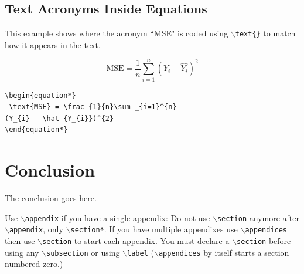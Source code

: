 \documentclass[lettersize,journal]{IEEEtran}
\begin{document}
\subsection{ Text Acronyms Inside Equations}
This example shows where the acronym ``MSE" is coded using $\backslash${\tt{text\{\}}} to match how it appears in the text.

\begin{equation*}
 \text{MSE} = \frac {1}{n}\sum _{i=1}^{n}(Y_{i} - \hat {Y_{i}})^{2}
\end{equation*}

\begin{verbatim}
\begin{equation*}
 \text{MSE} = \frac {1}{n}\sum _{i=1}^{n}
(Y_{i} - \hat {Y_{i}})^{2}
\end{equation*}
\end{verbatim}

\section{Conclusion}
The conclusion goes here.





{
Use $\backslash${\tt{appendix}} if you have a single appendix:
Do not use $\backslash${\tt{section}} anymore after $\backslash${\tt{appendix}}, only $\backslash${\tt{section*}}.
If you have multiple appendixes use $\backslash${\tt{appendices}} then use $\backslash${\tt{section}} to start each appendix.
You must declare a $\backslash${\tt{section}} before using any $\backslash${\tt{subsection}} or using $\backslash${\tt{label}} ($\backslash${\tt{appendices}} by itself
 starts a section numbered zero.)}





 
\end{document}
